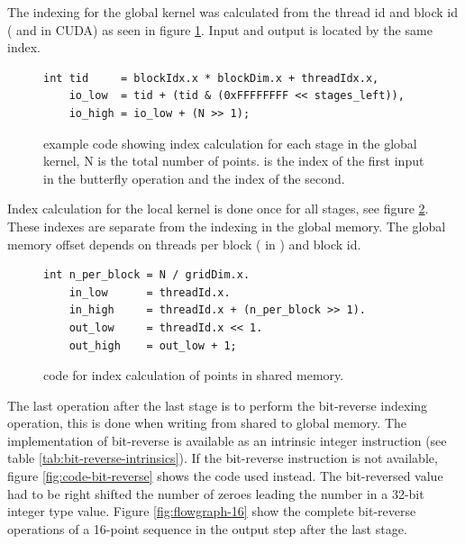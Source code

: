 The indexing for the global kernel was calculated from the thread id and block id ( and  in CUDA) as seen in figure \ref{fig:code-global-index}. Input and output is located by the same index.
\begin{figure}
	\centering
	\lstset{language=C++}
	\begin{framed}
	\begin{lstlisting}
int tid     = blockIdx.x * blockDim.x + threadIdx.x,
    io_low  = tid + (tid & (0xFFFFFFFF << stages_left)),
    io_high = io_low + (N >> 1);
	\end{lstlisting}
	\end{framed}
	\caption{ {\CU} example code showing index calculation for each stage in the global kernel, N is the total number of points.  is the index of the first input in the butterfly operation and  the index of the second.}
	\label{fig:code-global-index}
\end{figure}

Index calculation for the local kernel is done once for all stages, see figure \ref{fig:code-local-index}. These indexes are separate from the indexing in the global memory. The global memory offset depends on threads per block ( in {\CU}) and block id.
\begin{figure}
	\centering
	\lstset{language=C++}
	\begin{framed}
	\begin{lstlisting}
int n_per_block = N / gridDim.x.
    in_low      = threadId.x.
    in_high     = threadId.x + (n_per_block >> 1).
    out_low     = threadId.x << 1.
    out_high    = out_low + 1;
	\end{lstlisting}
	\end{framed}
	\caption{ {\CU} code for index calculation of points in shared memory. }
	\label{fig:code-local-index}
\end{figure}

The last operation after the last stage is to perform the bit-reverse indexing operation, this is done when writing from shared to global memory. The implementation of bit-reverse is available as an intrinsic integer instruction (see table \ref{tab:bit-reverse-intrinsics}). If the bit-reverse instruction is not available, figure \ref{fig:code-bit-reverse} shows the code used instead. The bit-reversed value had to be right shifted the number of zeroes leading the number in a 32-bit integer type value. Figure \ref{fig:flowgraph-16} show the complete bit-reverse operations of a 16-point sequence in the output step after the last stage.

